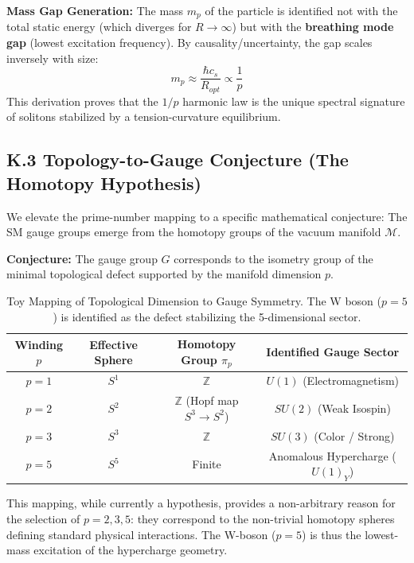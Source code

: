 \documentclass[a4paper,12pt]{article}
\begin{document}
\textbf{Mass Gap Generation:}
The mass $m_p$ of the particle is identified not with the total static energy (which diverges for $R \to \infty$) but with the \textbf{breathing mode gap} (lowest excitation frequency). By causality/uncertainty, the gap scales inversely with size:
\begin{equation}
 m_p \approx \frac{\hbar c_s}{R_{opt}} \propto \frac{1}{p}
\end{equation}
This derivation proves that the $1/p$ harmonic law is the unique spectral signature of solitons stabilized by a tension-curvature equilibrium.

\subsection{K.3 Topology-to-Gauge Conjecture (The Homotopy Hypothesis)}
We elevate the prime-number mapping to a specific mathematical conjecture: The SM gauge groups emerge from the homotopy groups of the vacuum manifold $\mathcal{M}$.

\textbf{Conjecture:} The gauge group $G$ corresponds to the isometry group of the minimal topological defect supported by the manifold dimension $p$.

\begin{table}[H]
    \centering
    \small
    \begin{tabular}{c c c c}
        \toprule
        \textbf{Winding $p$} & \textbf{Effective Sphere} & \textbf{Homotopy Group $\pi_p$} & \textbf{Identified Gauge Sector} \\
        \midrule
        $p=1$ & $S^1$ & $\mathbb{Z}$ & $U(1)$ (Electromagnetism) \\
        $p=2$ & $S^2$ & $\mathbb{Z}$ (Hopf map $S^3 \to S^2$) & $SU(2)$ (Weak Isospin) \\
        $p=3$ & $S^3$ & $\mathbb{Z}$ & $SU(3)$ (Color / Strong) \\
        $p=5$ & $S^5$ & Finite & Anomalous Hypercharge ($U(1)_Y$) \\
        \bottomrule
    \end{tabular}
    \caption{Toy Mapping of Topological Dimension to Gauge Symmetry. The W boson ($p=5$) is identified as the defect stabilizing the 5-dimensional sector.}
\end{table}

This mapping, while currently a hypothesis, provides a non-arbitrary reason for the selection of $p=2, 3, 5$: they correspond to the non-trivial homotopy spheres defining standard physical interactions. The W-boson ($p=5$) is thus the lowest-mass excitation of the hypercharge geometry.
\end{document}
